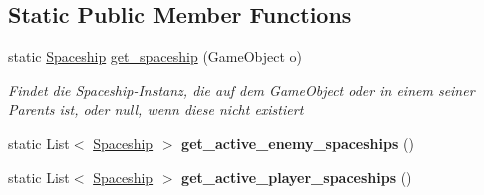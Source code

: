 \subsection*{Static Public Member Functions}
\begin{DoxyCompactItemize}
\item 
static \hyperlink{class_spaceship}{Spaceship} \hyperlink{class_spaceship_a46ebdafb571812867be422a6beb4ad21}{get\+\_\+spaceship} (Game\+Object o)
\begin{DoxyCompactList}\small\item\em Findet die Spaceship-\/\+Instanz, die auf dem Game\+Object oder in einem seiner Parents ist, oder null, wenn diese nicht existiert \end{DoxyCompactList}\item 
\mbox{\label{class_spaceship_a57fc32dd2636651fef55762f24c8bbcf}} 
static List$<$ \hyperlink{class_spaceship}{Spaceship} $>$ {\bfseries get\+\_\+active\+\_\+enemy\+\_\+spaceships} ()
\item 
\mbox{\label{class_spaceship_aaffca9101612342b71a4b9b237c2df69}} 
static List$<$ \hyperlink{class_spaceship}{Spaceship} $>$ {\bfseries get\+\_\+active\+\_\+player\+\_\+spaceships} ()
\end{DoxyCompactItemize}
